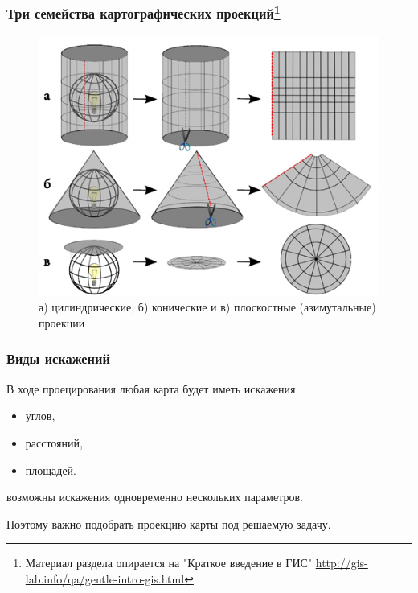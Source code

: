 \begin{frame}
    \frametitle{Три семейства картографических проекций\footnote{Материал раздела опирается на "Краткое введение в ГИС" \url{http://gis-lab.info/qa/gentle-intro-gis.html}}}
    \begin{figure}[!ht]
        \begin{center}
            \includegraphics[width=0.75\columnwidth]{./coordinates/img/proj_fam.jpg}
        \end{center}
        \caption{а) цилиндрические, б) конические и в) плоскостные (азимутальные) проекции}
    \end{figure}
\end{frame}

\begin{frame}
    \frametitle{Виды искажений}
    В ходе проецирования любая карта будет иметь искажения
    \begin{itemize}
        \item углов,
        \item расстояний,
        \item площадей.
    \end{itemize}
    возможны искажения одновременно нескольких параметров.

    Поэтому важно подобрать проекцию карты под решаемую задачу.

\end{frame}

